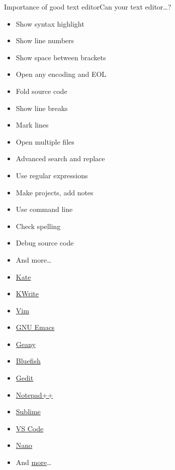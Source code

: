 \documentclass[compress, xelatex, 11pt, xcolor=svgnames, aspectratio=169,
	hyperref={
		bookmarks=true,
		unicode=true,
		colorlinks=true,
		pdftitle={Linux, command line and MetaCentrum},
		plainpages=false,
		pdfauthor={Vojtech Zeisek},
		pdfsubject={Course about use of Linux command line, writing shell scripts and using MetaCentrum of CESNET},
		pdfcreator={XeLaTeX},
		pdfkeywords={Linux, GNU, BASH, shell, command line, MetaCentrum},
		linkcolor=DarkRed, %
		anchorcolor=DarkBlue, %
		citecolor=Indigo, %
		filecolor=NavyBlue, %
		menucolor=DarkMagenta, %
		urlcolor=DarkBlue, %
		},
	url={hyphens, lowtilde} %
	]{beamer}
\begin{document}
\begin{frame}{Importance of good text editor}{Can your text editor\ldots ?}
	\label{editors}
	\begin{multicols}{2}
		\begin{itemize}
			\item Show syntax highlight
			\item Show line numbers
			\item Show space between brackets
			\item Open any encoding and EOL
			\item Fold source code
			\item Show line breaks
			\item Mark lines
			\item Open multiple files
			\item Advanced search and replace
			\item Use regular expressions
			\item Make projects, add notes
			\item Use command line
			\item Check spelling
			\item Debug source code
			\item And more\ldots
		\end{itemize}
	\end{multicols}
	\begin{multicols}{4}
		\begin{itemize}
			\item \href{https://kate-editor.org/}{Kate}
			\item \href{https://apps.kde.org/kwrite}{KWrite}
			\item \href{https://www.vim.org/}{Vim}
			\item \href{https://www.gnu.org/software/emacs/}{GNU Emacs}
			\item \href{https://www.geany.org/}{Geany}
			\item \href{https://bluefish.openoffice.nl/}{Bluefish}
			\item \href{https://gedit-technology.github.io/apps/gedit/}{Gedit}
			\item \href{https://notepad-plus-plus.org/}{Notepad++}
			\item \href{https://www.sublimetext.com/}{Sublime}
			\item \href{https://code.visualstudio.com/}{VS Code}
			\item \href{https://www.nano-editor.org/}{Nano}
			\item And \href{https://en.wikipedia.org/wiki/List_of_text_editors}{more}\ldots
		\end{itemize}
	\end{multicols}
\end{frame}
\end{document}
